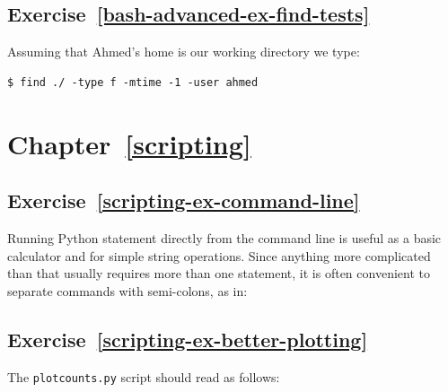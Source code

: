 \documentclass[
]{krantz}
\makeatletter
\newenvironment{Shaded}{\begin{snugshade}}{\end{snugshade}}
\newcommand{\NormalTok}[1]{#1}
\newcommand{\OperatorTok}[1]{\textcolor[rgb]{0.81,0.36,0.00}{\textbf{#1}}}
\newcommand{\StringTok}[1]{\textcolor[rgb]{0.31,0.60,0.02}{#1}}
\newenvironment{kframe}{%
\medskip{}
\setlength{\fboxsep}{.8em}
 \def\at@end@of@kframe{}%
 \ifinner\ifhmode%
  \def\at@end@of@kframe{\end{minipage}}%
  \begin{minipage}{\columnwidth}%
 \fi\fi%
 \def\FrameCommand##1{\hskip\@totalleftmargin \hskip-\fboxsep
 \colorbox{shadecolor}{##1}\hskip-\fboxsep
     \hskip-\linewidth \hskip-\@totalleftmargin \hskip\columnwidth}%
 \MakeFramed {\advance\hsize-\width
   \@totalleftmargin\z@ \linewidth\hsize
   \@setminipage}}%
 {\par\unskip\endMakeFramed%
 \at@end@of@kframe}
\renewenvironment{Shaded}{\begin{kframe}}{\end{kframe}}
\makeatother
\begin{document}
\hypertarget{exercise-refbash-advanced-ex-find-tests}{%
\subsection*{Exercise~\ref{bash-advanced-ex-find-tests}}\label{exercise-refbash-advanced-ex-find-tests}}


Assuming that Ahmed's home is our working directory we type:

\begin{verbatim}
$ find ./ -type f -mtime -1 -user ahmed
\end{verbatim}

\hypertarget{chapter-refscripting}{%
\section*{Chapter~\ref{scripting}}\label{chapter-refscripting}}

\hypertarget{exercise-refscripting-ex-command-line}{%
\subsection*{Exercise~\ref{scripting-ex-command-line}}\label{exercise-refscripting-ex-command-line}}


Running Python statement directly from the command line is useful as a basic calculator
and for simple string operations.
Since anything more complicated than that usually requires more than one statement,
it is often convenient to separate commands with semi-colons, as in:

\begin{Shaded}
\end{Shaded}

\hypertarget{exercise-refscripting-ex-better-plotting}{%
\subsection*{Exercise~\ref{scripting-ex-better-plotting}}\label{exercise-refscripting-ex-better-plotting}}


The \texttt{plotcounts.py} script should read as follows:
\end{document}
